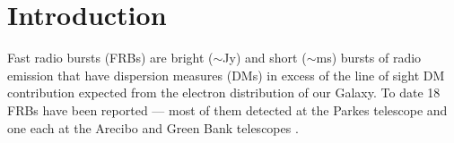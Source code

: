 \documentclass[iop]{emulateapj}
\begin{document}
\begin{abstract}

\end{abstract}



\section{Introduction}
 \label{sec:intro}
Fast radio bursts (FRBs) are bright ($\sim$Jy) and short ($\sim$ms) bursts of radio emission that have dispersion measures (DMs) in excess of the line of sight DM contribution expected from the electron distribution of our Galaxy. To date 18 FRBs have been reported
 --- most of them detected at the Parkes telescope \citep{lbm+07,tsb+13,bb14,kskl12,rsj15,pbb+15,kjb+16,cpk+16,rsb+16} and one each at the Arecibo \citep{sch+14} and Green Bank telescopes \citep{mls+15}. 
\end{document}
